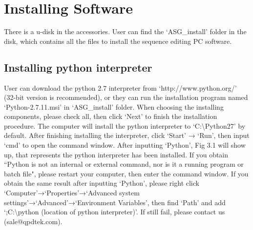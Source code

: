 \pagestyle{fancy}
\chapter{\heiti Installing Software}
\setmainfont{Times New Roman}
\hspace{-0.2cm}There is a u-disk in the accessories. User can find the `ASG\_install' folder in the disk, which contains all the files to install the sequence editing PC software.

\section{\heiti Installing python interpreter}
User can download the python 2.7 interpreter from `http://www.python.org/' (32-bit version is recommended), or they can run the installation program named  `Python-2.7.11.msi'  in `ASG\_install' folder. When choosing the installing components, please check all, then click `Next' to finish the installation procedure. The computer will install the python interpreter to `C:\textbackslash Python27' by default. After finishing installing the interpreter, click  `Start' → `Run', then input  `cmd' to open the command window. After inputting `Python', Fig 3.1 will show up, that represents the python interpreter has been installed. If you obtain ``Python is not an internal or external command, nor is it a running program or batch file", please restart your computer, then enter the command window. If you obtain the same result after inputting `Python', please right click `Computer'→`Properties'→`Advanced system settings'→`Advanced'→`Environment Variables', then find `Path'  and add `;C:\textbackslash python (location of python interpreter)'. If still fail, please contact us (sale@qpdtek.com).

